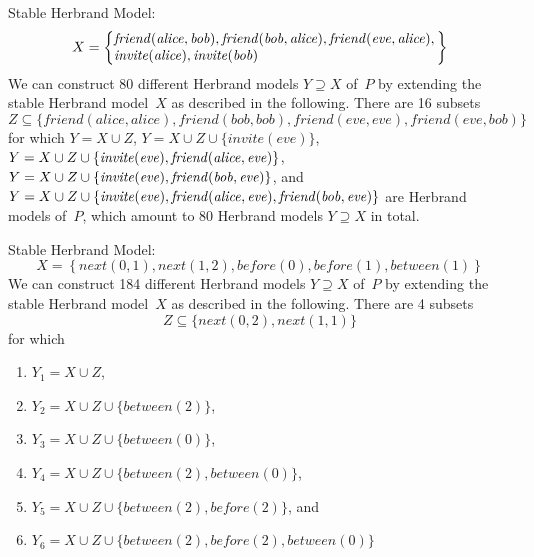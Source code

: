 \begin{Loesung}
{\begin{UList}
%
\item
Stable Herbrand Model: \[X = \left\{\begin{array}{@{}l@{}}\mathit{friend}(\mathit{alice},\mathit{bob}),\mathit{friend}(\mathit{bob},\mathit{alice}),\mathit{friend}(\mathit{eve},\mathit{alice}),{}\\\mathit{invite}(\mathit{alice}),\mathit{invite}(\mathit{bob})\end{array}\right\}\]
We can construct 80 different Herbrand models $Y\supseteq X$ of~$P$ by
extending the stable Herbrand model~$X$ as described in the following.
There are 16 subsets
\[Z\subseteq\{\mathit{friend}(\mathit{alice},\mathit{alice}),\mathit{friend}(\mathit{bob},\mathit{bob}),
              \mathit{friend}(\mathit{eve},\mathit{eve}),\mathit{friend}(\mathit{eve},\mathit{bob})\}\]
for which
$Y=X\cup Z$,
$Y=X\cup Z\cup\{\mathit{invite}(\mathit{eve})\}$,
$Y=X\cup Z\cup\{\mathit{invite}(\mathit{eve}),\linebreak[1]\mathit{friend}(\mathit{alice},\mathit{eve})\}$,
$Y=X\cup Z\cup\{\mathit{invite}(\mathit{eve}),\linebreak[1]\mathit{friend}(\mathit{bob},\mathit{eve})\}$, and
$Y=X\cup Z\cup\{\mathit{invite}(\mathit{eve}),\linebreak[1]\mathit{friend}(\mathit{alice},\mathit{eve}),\linebreak[1]\mathit{friend}(\mathit{bob},\mathit{eve})\}$
are Herbrand models of~$P$, which amount to 80 Herbrand models $Y\supseteq X$ in total.
%
\item
Stable Herbrand Model: \[X = \left\{\mathit{next}(0,1),\mathit{next}(1,2),\mathit{before}(0),\mathit{before}(1),\mathit{between}(1)\right\}\]
We can construct 184 different Herbrand models $Y\supseteq X$ of~$P$ by
extending the stable Herbrand model~$X$ as described in the following.
There are 4 subsets
\[Z\subseteq\{\mathit{next}(0,2),\mathit{next}(1,1)\}\]
for which
\begin{enumerate}
\item $Y_1=X\cup Z$,
\item $Y_2=X\cup Z\cup\{\mathit{between}(2)\}$,
\item $Y_3=X\cup Z\cup\{\mathit{between}(0)\}$,
\item $Y_4=X\cup Z\cup\{\mathit{between}(2),\mathit{between}(0)\}$,
\item $Y_5=X\cup Z\cup\{\mathit{between}(2),\mathit{before}(2)\}$, and
\item $Y_6=X\cup Z\cup\{\mathit{between}(2),\mathit{before}(2),\mathit{between}(0)\}$
\end{enumerate}

\end{UList}}
\end{Loesung}
